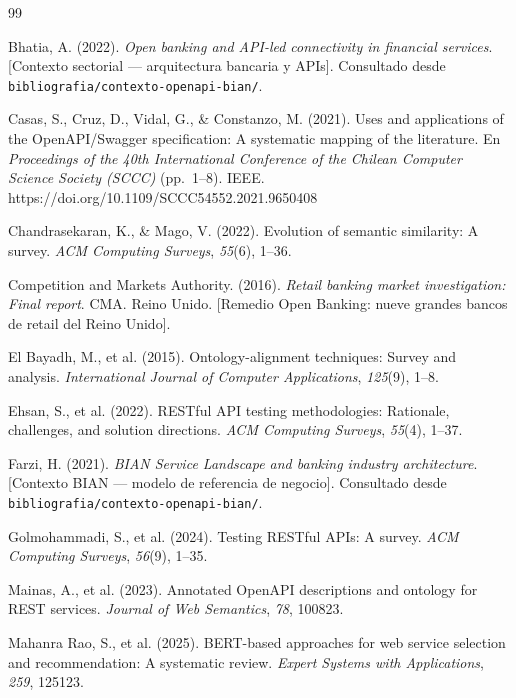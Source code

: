 
\begin{thebibliography}{99}

Bhatia, A. (2022).
\textit{Open banking and API-led connectivity in financial services}.
[Contexto sectorial — arquitectura bancaria y APIs].
Consultado desde \texttt{bibliografia/contexto-openapi-bian/}.

Casas, S., Cruz, D., Vidal, G., \& Constanzo, M. (2021).
Uses and applications of the OpenAPI/Swagger specification: A systematic mapping of the literature.
En \textit{Proceedings of the 40th International Conference of the Chilean Computer Science Society (SCCC)} (pp.~1--8). IEEE.
https://doi.org/10.1109/SCCC54552.2021.9650408

Chandrasekaran, K., \& Mago, V. (2022).
Evolution of semantic similarity: A survey.
\textit{ACM Computing Surveys}, \textit{55}(6), 1--36.

Competition and Markets Authority. (2016).
\textit{Retail banking market investigation: Final report}.
CMA. Reino Unido.
[Remedio Open Banking: nueve grandes bancos de retail del Reino Unido].

El Bayadh, M., et al. (2015).
Ontology-alignment techniques: Survey and analysis.
\textit{International Journal of Computer Applications}, \textit{125}(9), 1--8.

Ehsan, S., et al. (2022).
RESTful API testing methodologies: Rationale, challenges, and solution directions.
\textit{ACM Computing Surveys}, \textit{55}(4), 1--37.

Farzi, H. (2021).
\textit{BIAN Service Landscape and banking industry architecture}.
[Contexto BIAN — modelo de referencia de negocio].
Consultado desde \texttt{bibliografia/contexto-openapi-bian/}.

Golmohammadi, S., et al. (2024).
Testing RESTful APIs: A survey.
\textit{ACM Computing Surveys}, \textit{56}(9), 1--35.

Mainas, A., et al. (2023).
Annotated OpenAPI descriptions and ontology for REST services.
\textit{Journal of Web Semantics}, \textit{78}, 100823.

Mahanra Rao, S., et al. (2025).
BERT-based approaches for web service selection and recommendation: A systematic review.
\textit{Expert Systems with Applications}, \textit{259}, 125123.


\end{thebibliography}
